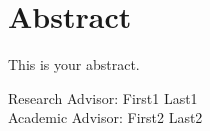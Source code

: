 \chapter*{Abstract}

This is your abstract.

\vfill
\noindent Research Advisor: First1 Last1 \hfill \\
\noindent Academic Advisor: First2 Last2 \hfill
